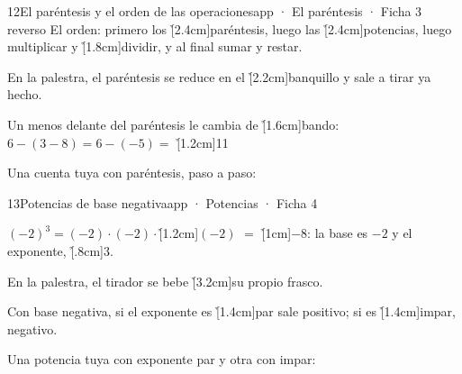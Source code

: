 \documentclass[12pt]{article}
\begin{document}
\begin{cromo}{12}{El paréntesis y el orden de las operaciones}{app · El paréntesis · Ficha 3 reverso}
\completa El orden: primero los \h[2.4cm]{paréntesis}, luego las \h[2.4cm]{potencias}, luego multiplicar y \h[1.8cm]{dividir}, y al final sumar y restar.\par\vspace{2mm}
En la palestra, el paréntesis se reduce en el \h[2.2cm]{banquillo} y sale a tirar ya hecho.\par\vspace{2mm}
Un menos delante del paréntesis le cambia de \h[1.6cm]{bando}: $6 - (3 - 8) = 6 - (-5) =$ \h[1.2cm]{11}

\vspace{2mm}
\tuejemplo Una cuenta tuya con paréntesis, paso a paso:
\end{cromo}

\begin{cromo}{13}{Potencias de base negativa}{app · Potencias · Ficha 4}
\begin{minipage}[c]{.72\linewidth}\raggedright
\completa $(-2)^3 = (-2)\cdot(-2)\cdot$\h[1.2cm]{$(-2)$} $=$ \h[1cm]{$-8$}: la base es $-2$ y el exponente, \h[.8cm]{3}.\par\vspace{2mm}
En la palestra, el tirador se bebe \h[3.2cm]{su propio frasco}.\par\vspace{2mm}
Con base negativa, si el exponente es \h[1.4cm]{par} sale positivo; si es \h[1.4cm]{impar}, negativo.
\end{minipage}%
\begin{minipage}[c]{.28\linewidth}\centering{}\end{minipage}

\vspace{2mm}
\tuejemplo Una potencia tuya con exponente par y otra con impar:
\end{cromo}
\end{document}

